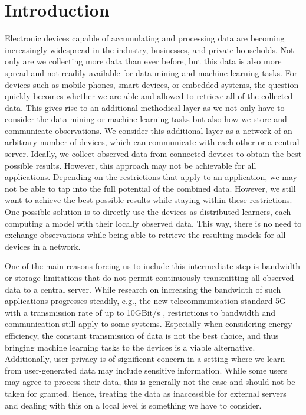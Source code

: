 \chapter{Introduction}
Electronic devices capable of accumulating and processing data are becoming increasingly widespread in the industry, businesses, and private households.
Not only are we collecting more data than ever before, but this data is also more spread and not readily available for data mining and machine learning tasks.
For devices such as mobile phones, smart devices, or embedded systems, the question quickly becomes whether we are able and allowed to retrieve all of the collected data.
This gives rise to an additional methodical layer as we not only have to consider the data mining or machine learning tasks but also how we store and communicate observations.
We consider this additional layer as a network of an arbitrary number of devices, which can communicate with each other or a central server.
Ideally, we collect observed data from connected devices to obtain the best possible results.
However, this approach may not be achievable for all applications.
Depending on the restrictions that apply to an application, we may not be able to tap into the full potential of the combined data.
However, we still want to achieve the best possible results while staying within these restrictions.
One possible solution is to directly use the devices as distributed learners, each computing a model with their locally observed data.
This way, there is no need to exchange observations while being able to retrieve the resulting models for all devices in a network.

One of the main reasons forcing us to include this intermediate step is bandwidth or storage limitations that do not permit continuously transmitting all observed data to a central server.
While research on increasing the bandwidth of such applications progresses steadily, e.g., the new telecommunication standard 5G with a transmission rate of up to 10GBit/s \cite{nordrum2017ieee}, restrictions to bandwidth and communication still apply to some systems. 
Especially when considering energy-efficiency, the constant transmission of data is not the best choice, and thus bringing machine learning tasks to the devices is a viable alternative.
Additionally, user privacy is of significant concern in a setting where we learn from user-generated data may include sensitive information.
While some users may agree to process their data, this is generally not the case and should not be taken for granted. 
Hence, treating the data as inaccessible for external servers and dealing with this on a local level is something we have to consider.

